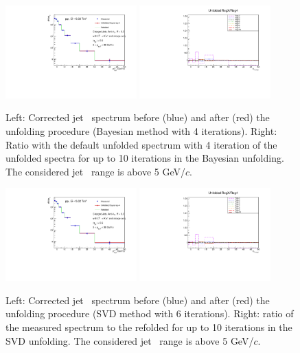 \begin{figure}[bth]
\centering
\includegraphics[width=0.45\textwidth]{pPbcuts_2sig/unfolding/unfoldedSpectrum_UnfSpectrum_Bayes}
\includegraphics[width=0.45\textwidth]{pPbcuts_2sig/unfolding/unfoldedSpectrum_unfRatio_Bayes}
\caption{Left: Corrected jet \pt\ spectrum before (blue) and after (red) the unfolding procedure (Bayesian method with 4 iterations). Right: Ratio with the default unfolded spectrum with 4 iteration of the unfolded spectra for up to 10 iterations in the Bayesian unfolding. The considered jet \pt\ range is above 5 GeV/$c$.}
\label{fig:UnfSpec_pPb_Dzero_reg4}
\end{figure}

\begin{figure}[bth]
\centering
\includegraphics[width=0.45\textwidth]{pPbcuts_2sig/unfolding/unfoldedSpectrum_UnfSpectrum_Bayes}
\includegraphics[width=0.45\textwidth]{pPbcuts_2sig/unfolding/unfoldedSpectrum_unfRatio_Bayes}
\caption{Left: Corrected jet \pt\ spectrum before (blue) and after (red) the unfolding procedure (SVD method with 6 iterations). Right: ratio of the measured spectrum to the refolded for up to 10 iterations in the SVD unfolding. The considered jet \pt\ range is above 5 GeV/$c$.}
\label{fig:UnfSpec_pPb_Dzero_SVD}
\end{figure}


